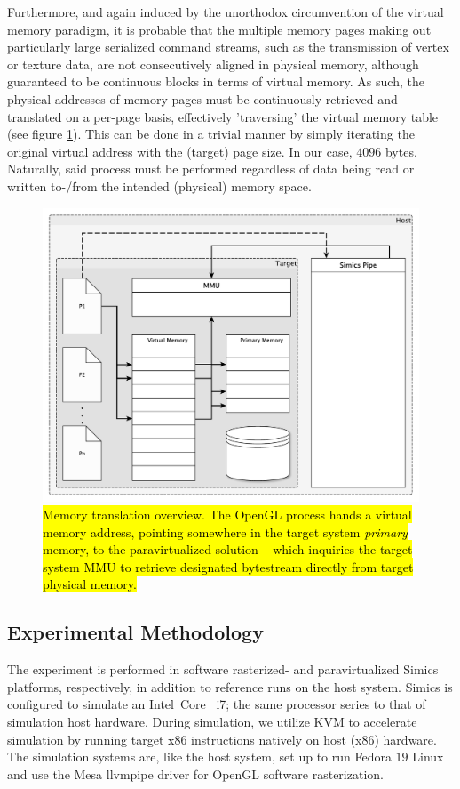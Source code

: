 Furthermore, and again induced by the unorthodox circumvention of the virtual memory paradigm, it is probable that the multiple memory pages making out particularly large serialized command streams, such as the transmission of vertex or texture data, are not consecutively aligned in physical memory, although guaranteed to be continuous blocks in terms of virtual memory.
As such, the physical addresses of memory pages must be continuously retrieved and translated on a per-page basis, effectively 'traversing' the virtual memory table (see figure \ref{fig:virtualmemory}).
This can be done in a trivial manner by simply iterating the original virtual address with the (target) page size.
In our case, $4096$ bytes.
Naturally, said process must be performed regardless of data being read or written to-/from the intended (physical) memory space.

\begin{figure}
\centering
\includegraphics[width=\linewidth]{img/yedvirtualmemory.pdf}
\caption[Memory translation overview]{\hl{Memory translation overview. The OpenGL process hands a virtual memory address, pointing somewhere in the target system \textit{primary} memory, to the paravirtualized solution -- which inquiries the target system MMU to retrieve designated bytestream directly from target physical memory.}}
\label{fig:virtualmemory}
\end{figure}

\subsection{Experimental Methodology}
\label{sec:experimentalmethodology}
The experiment is performed in software rasterized- and paravirtualized Simics platforms, respectively, in addition to reference runs on the host system.
Simics is configured to simulate an Intel\circledR\ Core \texttrademark\ i7; the same processor series to that of simulation host hardware.
During simulation, we utilize KVM to accelerate simulation by running target x86 instructions natively on host (x86) hardware.
The simulation systems are, like the host system, set up to run Fedora $19$ Linux and use the Mesa llvmpipe driver for OpenGL software rasterization.

